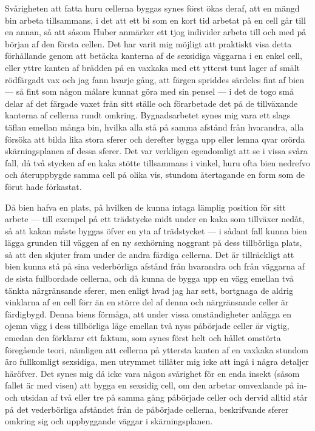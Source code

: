 Svårigheten att fatta huru cellerna byggas synes först ökas deraf, att en mängd bin arbeta tillsammans, i det att ett bi som en kort tid arbetat på en cell går till en annan, så att såsom Huber anmärker ett tjog individer arbeta till och med på början af den första cellen. Det har varit mig möjligt att praktiskt visa detta förhållande genom att betäcka kanterna af de sexsidiga väggarna i en enkel cell, eller yttre kanten af brädden på en vaxkaka med ett ytterst tunt lager af smält rödfärgadt vax och jag fann hvarje gång, att färgen spriddes särdeles fint af bien — så fint som någon målare kunnat göra med sin pensel — i det de togo små delar af det färgade vaxet från sitt ställe och förarbetade det på de tillväxande kanterna af cellerna rundt omkring. Bygnadsarbetet synes mig vara ett slags täflan emellan många bin, hvilka alla stå på samma afstånd från hvarandra, alla försöka att bilda lika stora sferer och derefter bygga upp eller lemna qvar orörda skärningsplanen af dessa sferer. Det var verkligen egendomligt att se i vissa svåra fall, då två stycken af en kaka stötte tillsammans i vinkel, huru ofta bien nedrefvo och återuppbygde samma cell på olika vis, stundom återtagande en form som de förut hade förkastat.

Då bien hafva en plats, på hvilken de kunna intaga lämplig position för sitt arbete — till exempel på ett trädstycke midt under en kaka som tillväxer nedåt, så att kakan måste byggas öfver en yta af trädstycket — i sådant fall kunna bien lägga grunden till väggen af en ny sexhörning noggrant på dess tillbörliga plats, så att den skjuter fram under de andra färdiga cellerna. Det är tillräckligt att bien kunna stå på sina vederbörliga afstånd från hvarandra och från väggarna af de sista fullbordade cellerna, och då kunna de bygga upp en vägg emellan två tänkta närgränsande sferer, men enligt hvad jag har sett, bortgnaga de aldrig vinklarna af en cell förr än en större del af denna och närgränsande celler är färdigbygd. Denna biens förmåga, att under vissa omständigheter anlägga en ojemn vägg i dess tillbörliga läge emellan två nyss påbörjade celler är vigtig, emedan den förklarar ett faktum, som synes först helt och hållet omstörta föregående teori, nämligen att cellerna på yttersta kanten af en vaxkaka stundom äro fullkomligt sexsidiga, men utrymmet tillåter mig icke att ingå i några detaljer häröfver. Det synes mig då icke vara någon svårighet för en enda insekt (såsom fallet är med visen) att bygga en sexsidig cell, om den arbetar omvexlande på in- och utsidan af två eller tre på samma gång påbörjade celler och dervid alltid står på det vederbörliga afståndet från de påbörjade cellerna, beskrifvande sferer omkring sig och uppbyggande väggar i skärningsplanen.

